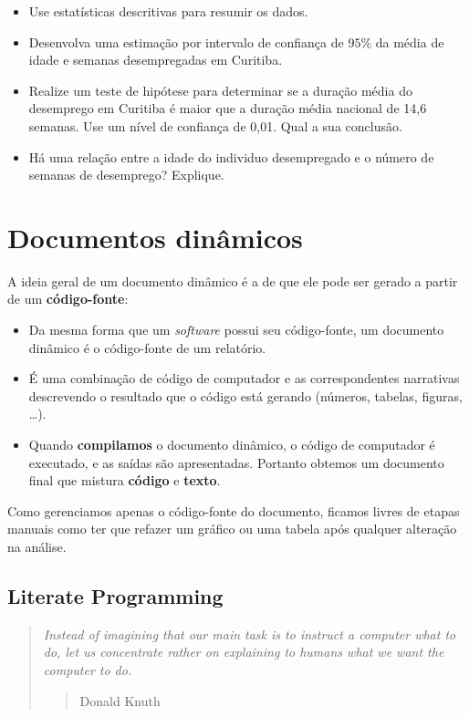 \documentclass[10pt,a4paper]{book}
\providecommand{\tightlist}{%
  \setlength{\itemsep}{0pt}\setlength{\parskip}{0pt}}
\begin{document}
\begin{itemize}
\tightlist
\item
  Use estatísticas descritivas para resumir os dados.
\item
  Desenvolva uma estimação por intervalo de confiança de \(95\%\) da
  média de idade e semanas desempregadas em Curitiba.
\item
  Realize um teste de hipótese para determinar se a duração média do
  desemprego em Curitiba é maior que a duração média nacional de 14,6
  semanas. Use um nível de confiança de 0,01. Qual a sua conclusão.
\item
  Há uma relação entre a idade do individuo desempregado e o número de
  semanas de desemprego? Explique.
\end{itemize}

\appendix


\chapter{Documentos dinâmicos}\label{documentos-dinuxe2micos}

A ideia geral de um documento dinâmico é a de que ele pode ser gerado a
partir de um \textbf{código-fonte}:

\begin{itemize}
\tightlist
\item
  Da mesma forma que um \emph{software} possui seu código-fonte, um
  documento dinâmico é o código-fonte de um relatório.
\item
  É uma combinação de código de computador e as correspondentes
  narrativas descrevendo o resultado que o código está gerando (números,
  tabelas, figuras, \ldots{}).
\item
  Quando \textbf{compilamos} o documento dinâmico, o código de
  computador é executado, e as saídas são apresentadas. Portanto obtemos
  um documento final que mistura \textbf{código} e \textbf{texto}.
\end{itemize}

Como gerenciamos apenas o código-fonte do documento, ficamos livres de
etapas manuais como ter que refazer um gráfico ou uma tabela após
qualquer alteração na análise.

\section{Literate Programming}\label{literate-programming}

\begin{quote}
\emph{Instead of imagining that our main task is to instruct a computer
what to do, let us concentrate rather on explaining to humans what we
want the computer to do.}

\begin{quote}
Donald Knuth
\end{quote}
\end{quote}
\end{document}
